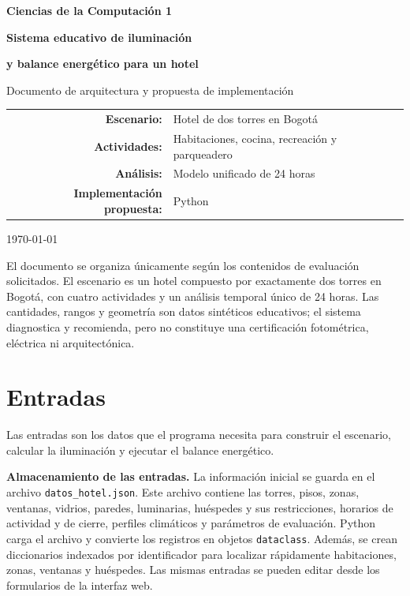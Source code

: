 \documentclass[12pt,a4paper]{article}
\newcommand{\codigo}[1]{\texttt{#1}}
\begin{document}
\begin{titlepage}
    \centering
    \vspace*{1.5cm}
    {\Large \textbf{Ciencias de la Computación 1}\par}
    \vspace{0.9cm}
    {\Huge \textbf{Sistema educativo de iluminación}\par}
    {\Huge \textbf{y balance energético para un hotel}\par}
    \vspace{1.2cm}
    {\Large Documento de arquitectura y propuesta de implementación\par}
    \vfill
    \begin{tabular}{rl}
        \textbf{Escenario:} & Hotel de dos torres en Bogotá\\
        \textbf{Actividades:} & Habitaciones, cocina, recreación y parqueadero\\
        \textbf{Análisis:} & Modelo unificado de 24 horas\\
        \textbf{Implementación propuesta:} & Python\\
    \end{tabular}
    \vfill
    {\large \today\par}
\end{titlepage}

\tableofcontents
\newpage

El documento se organiza únicamente según los contenidos de evaluación solicitados. El escenario es un hotel compuesto por exactamente dos torres en Bogotá, con cuatro actividades y un análisis temporal único de 24 horas. Las cantidades, rangos y geometría son datos sintéticos educativos; el sistema diagnostica y recomienda, pero no constituye una certificación fotométrica, eléctrica ni arquitectónica.

\section{Entradas}

Las entradas son los datos que el programa necesita para construir el escenario, calcular la iluminación y ejecutar el balance energético.

\textbf{Almacenamiento de las entradas.} La información inicial se guarda en el archivo \codigo{datos\_hotel.json}. Este archivo contiene las torres, pisos, zonas, ventanas, vidrios, paredes, luminarias, huéspedes y sus restricciones, horarios de actividad y de cierre, perfiles climáticos y parámetros de evaluación. Python carga el archivo y convierte los registros en objetos \codigo{dataclass}. Además, se crean diccionarios indexados por identificador para localizar rápidamente habitaciones, zonas, ventanas y huéspedes. Las mismas entradas se pueden editar desde los formularios de la interfaz web.
\end{document}
